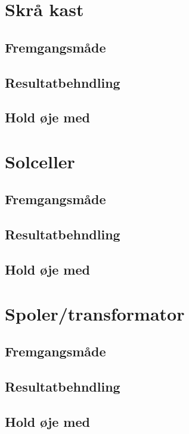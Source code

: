 \section{Skrå kast}
\subsection{Fremgangsmåde}

\subsection{Resultatbehndling}

\subsection{Hold øje med}

\section{Solceller}
\subsection{Fremgangsmåde}

\subsection{Resultatbehndling}

\subsection{Hold øje med}

\section{Spoler/transformator}
\subsection{Fremgangsmåde}

\subsection{Resultatbehndling}

\subsection{Hold øje med}

